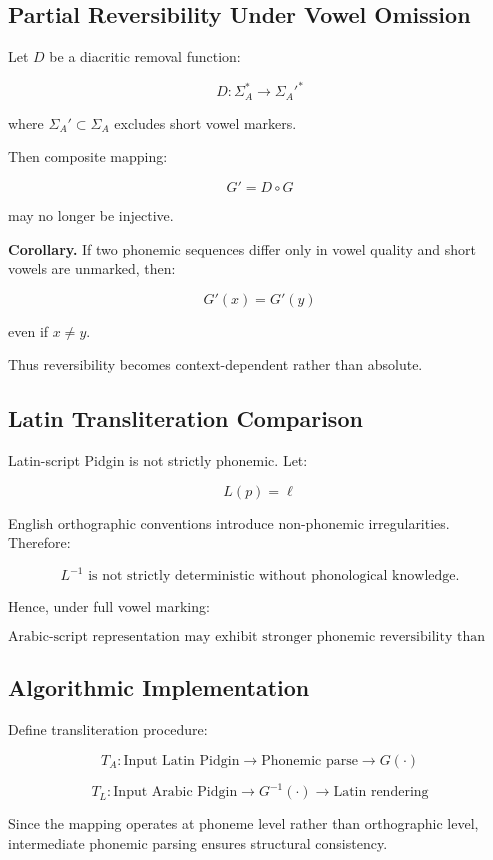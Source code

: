 \documentclass[12pt]{article}
\begin{document}
\subsection{Partial Reversibility Under Vowel Omission}

Let \( D \) be a diacritic removal function:

\[
D : \Sigma_A^* \rightarrow \Sigma_A'^*
\]

where \( \Sigma_A' \subset \Sigma_A \) excludes short vowel markers.

Then composite mapping:

\[
G' = D \circ G
\]

may no longer be injective.

\textbf{Corollary.}  
If two phonemic sequences differ only in vowel quality and short vowels are unmarked, then:

\[
G'(x) = G'(y)
\]

even if \( x \neq y \).

Thus reversibility becomes context-dependent rather than absolute.

\subsection{Latin Transliteration Comparison}

Latin-script Pidgin is not strictly phonemic. Let:

\[
L(p) = \ell
\]

English orthographic conventions introduce non-phonemic irregularities. Therefore:

\[
L^{-1} \text{ is not strictly deterministic without phonological knowledge.}
\]

Hence, under full vowel marking:

\[
\text{Arabic-script representation may exhibit stronger phonemic reversibility than Latin representation.}
\]

\subsection{Algorithmic Implementation}

Define transliteration procedure:

\[
T_A: \text{Input Latin Pidgin} \rightarrow \text{Phonemic parse} \rightarrow G(\cdot)
\]

\[
T_L: \text{Input Arabic Pidgin} \rightarrow G^{-1}(\cdot) \rightarrow \text{Latin rendering}
\]

Since the mapping operates at phoneme level rather than orthographic level, intermediate phonemic parsing ensures structural consistency.
\end{document}
